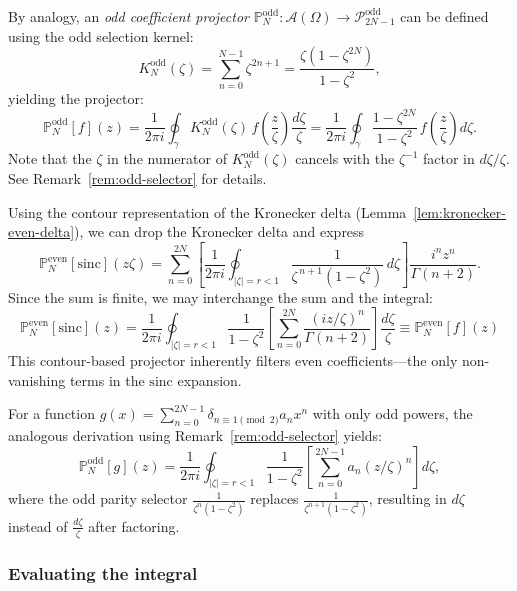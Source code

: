\begin{note}
By analogy, an \emph{odd coefficient projector} $\mathbb{P}_N^{\text{odd}}: \mathcal{A}(\Omega) \to \mathcal{P}_{2N-1}^{\text{odd}}$ can be defined using the odd selection kernel:
\[
K_N^{\text{odd}}(\zeta) = \sum_{n=0}^{N-1} \zeta^{2n+1} = \frac{\zeta(1 - \zeta^{2N})}{1 - \zeta^2},
\]
yielding the projector:
\[
\mathbb{P}_N^{\text{odd}}[f](z) = \frac{1}{2\pi i} \oint_{\gamma} K_N^{\text{odd}}(\zeta) \, f\!\left(\frac{z}{\zeta}\right) \frac{d\zeta}{\zeta} = \frac{1}{2\pi i} \oint_{\gamma} \frac{1-\zeta^{2N}}{1-\zeta^2} \, f\!\left(\frac{z}{\zeta}\right) d\zeta.
\]
Note that the $\zeta$ in the numerator of $K_N^{\text{odd}}(\zeta)$ cancels with the $\zeta^{-1}$ factor in $d\zeta/\zeta$. See Remark~\ref{rem:odd-selector} for details.
\end{note}

Using the contour representation of the Kronecker delta (Lemma~\ref{lem:kronecker-even-delta}),
we can drop the Kronecker delta and express
\[
\mathbb{P}_N^{\text{even}}[\mathrm{sinc}](z\zeta)
= \sum_{n=0}^{2N} \left[\frac{1}{2\pi i}\oint_{|\zeta| = r < 1} \frac{1}{\zeta^{\,n+1}(1 - \zeta^2)} \, d\zeta\right] \frac{i^n z^n}{\Gamma(n+2)}.
\]
Since the sum is finite, we may interchange the sum and the integral:
\[
\boxed{
\mathbb{P}_N^{\text{even}}[\mathrm{sinc}](z)
= \frac{1}{2\pi i}\oint_{|\zeta| = r < 1} \frac{1}{1 - \zeta^2}
\left[\sum_{n=0}^{2N} \frac{(iz/\zeta)^n}{\Gamma(n+2)}\right] \frac{d\zeta}{\zeta} \equiv \mathbb{P}_N^{\text{even}}[f](z)
}
\]
This contour-based projector inherently filters even coefficients—the only non-vanishing terms in the $\mathrm{sinc}$ expansion.

\begin{remark}
For a function $g(x) = \sum_{n=0}^{2N-1} \delta_{n \equiv 1 \pmod{2}} a_n x^n$ with only odd powers, the analogous derivation using Remark~\ref{rem:odd-selector} yields:
\[
\mathbb{P}_N^{\text{odd}}[g](z) = \frac{1}{2\pi i}\oint_{|\zeta| = r < 1} \frac{1}{1 - \zeta^2}
\left[\sum_{n=0}^{2N-1} a_n (z/\zeta)^n\right] d\zeta,
\]
where the odd parity selector $\frac{1}{\zeta^n(1-\zeta^2)}$ replaces $\frac{1}{\zeta^{n+1}(1-\zeta^2)}$, resulting in $d\zeta$ instead of $\frac{d\zeta}{\zeta}$ after factoring.
\end{remark}

\subsubsection{Evaluating the integral}

